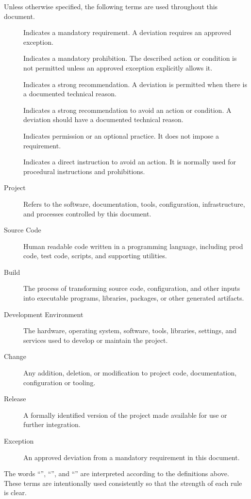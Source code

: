 Unless otherwise specified, the following terms are used throughout this document.

\begin{description}
    \item[\must] Indicates a mandatory requirement. A deviation requires an approved exception.

    \item[\mustnot] Indicates a mandatory prohibition. The described action or condition is not permitted unless an approved exception explicitly allows it.

    \item[\should] Indicates a strong recommendation. A deviation is permitted when there is a documented technical reason.

    \item[\shouldnot] Indicates a strong recommendation to avoid an action or condition. A deviation should have a documented technical reason.

    \item[\may] Indicates permission or an optional practice. It does not impose a requirement.

    \item[\donot] Indicates a direct instruction to avoid an action. It is normally used for procedural instructions and prohibitions. 

    \item[Project] Refers to the software, documentation, tools, configuration, infrastructure, and processes controlled by this document.

    \item[Source Code] Human readable code written in a programming language, including prod code, test code, scripts, and supporting utilities.

    \item[Build] The process of transforming source code, configuration, and other inputs into executable programs, libraries, packages, or other generated artifacts.

    \item[Development Environment] The hardware, operating system, software, tools, libraries, settings, and services used to develop or maintain the project.

    \item[Change] Any addition, deletion, or modification to project code, documentation, configuration or tooling.

    \item[Release] A formally identified version of the project made available for use or further integration.

    \item[Exception] An approved deviation from a mandatory requirement in this document.

\end{description}

The words ``\must'', ``\should'', and ``\may'' are interpreted according to the definitions above. These terms are intentionally used consistently so that the strength of each rule is clear.